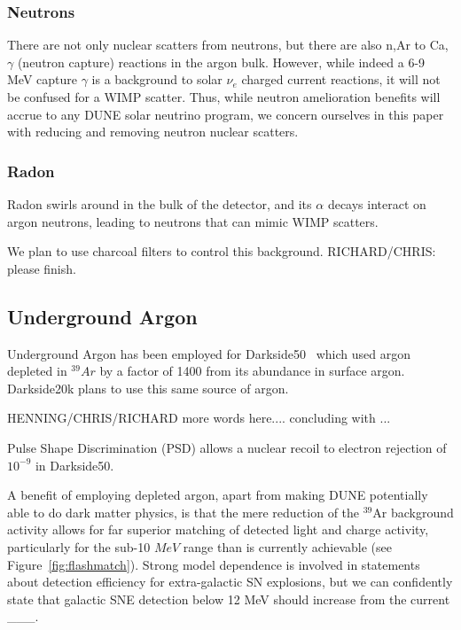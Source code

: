 \documentclass[a4paper,11pt]{article}
\begin{document}
\subsubsection{Neutrons}
There are not only nuclear scatters from neutrons, but there are also n,Ar to Ca,$\gamma$ (neutron capture) reactions in the argon bulk. However, while indeed a 6-9 MeV capture $\gamma$ is a background to solar $\nu_e$ charged current reactions, it will not be confused for a WIMP scatter. Thus, while neutron amelioration benefits will accrue to any DUNE solar neutrino program, we concern ourselves in this paper with reducing and removing neutron nuclear scatters.

\subsubsection{Radon}
Radon swirls around in the bulk of the detector, and its $\alpha$ decays interact on argon neutrons, leading to neutrons that can mimic WIMP scatters.

We plan to use charcoal filters to control this background. 
RICHARD/CHRIS: please finish.

\subsection{Underground Argon}
Underground Argon has been employed for Darkside50~\cite{darkside50} which used argon depleted in $^{39}Ar$ by a factor of 1400 from its abundance in surface argon. Darkside20k plans to use this same source of argon.

HENNING/CHRIS/RICHARD more words here.... concluding with ...

Pulse Shape Discrimination (PSD) allows a nuclear recoil to electron rejection of $10^{-9}$ in Darkside50.

A benefit of employing depleted argon, apart from making DUNE potentially able to do dark matter physics, is that the mere reduction of the $^{39}$Ar background activity allows for far superior matching of detected light and charge activity, particularly for the sub-10 $MeV$ range than is currently achievable (see Figure~\ref{fig:flashmatch}). Strong model dependence is involved in statements about detection efficiency for extra-galactic SN explosions, but we can confidently state that galactic SNE detection below 12 MeV should increase from the current \_\_\_.
\end{document}
